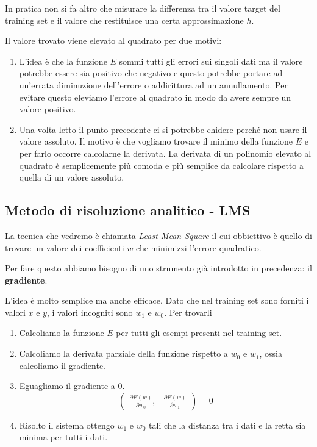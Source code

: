 In pratica non si fa altro che misurare la differenza tra il valore target del training set e il valore che restituisce
una certa approssimazione $h$.

Il valore trovato viene elevato al quadrato per due motivi:
\begin{enumerate}
	\item L'idea \`e che la funzione $E$ sommi tutti gli errori sui singoli dati ma il valore potrebbe essere sia positivo
	      che negativo e questo potrebbe portare ad un'errata diminuzione dell'errore o addirittura ad un annullamento.
	      Per evitare questo eleviamo l'errore al quadrato in modo da avere sempre un valore positivo.
	\item Una volta letto il punto precedente ci si potrebbe chidere perch\'e non usare il valore assoluto. Il motivo \`e
	      che vogliamo trovare il minimo della funzione $E$ e per farlo occorre calcolarne la derivata. La derivata di un
	      polinomio elevato al quadrato \`e semplicemente pi\`u comoda e pi\`u semplice da calcolare rispetto a quella
	      di un valore assoluto.
\end{enumerate}

\subsection{Metodo di risoluzione analitico - LMS}
La tecnica che vedremo \`e chiamata \emph{Least Mean Square} il cui obbiettivo \`e quello di trovare un valore dei
coefficienti $w$ che minimizzi l'errore quadratico.

Per fare questo abbiamo bisogno di uno strumento gi\`a introdotto in precedenza: il \textbf{gradiente}.

L'idea \`e molto semplice ma anche efficace. Dato che nel training set sono forniti i valori $x$ e $y$, i valori incogniti
sono $w_1$ e $w_0$. Per trovarli
\begin{enumerate}
	\item Calcoliamo la funzione $E$ per tutti gli esempi presenti nel training set.
	\item Calcoliamo la derivata parziale della funzione rispetto a $w_0$ e $w_1$, ossia calcoliamo il gradiente.
	\item Eguagliamo il gradiente a 0.
	      \[
		      \begin{pmatrix}
			      \displaystyle\frac{ \partial E(w) }{ \partial w_0 }, &
			      \displaystyle\frac{ \partial E(w) }{ \partial w_1 }
		      \end{pmatrix} = 0
	      \]
	\item Risolto il sistema ottengo $w_1$ e $w_0$ tali che la distanza tra i dati e la retta sia minima per tutti i dati.
\end{enumerate}

